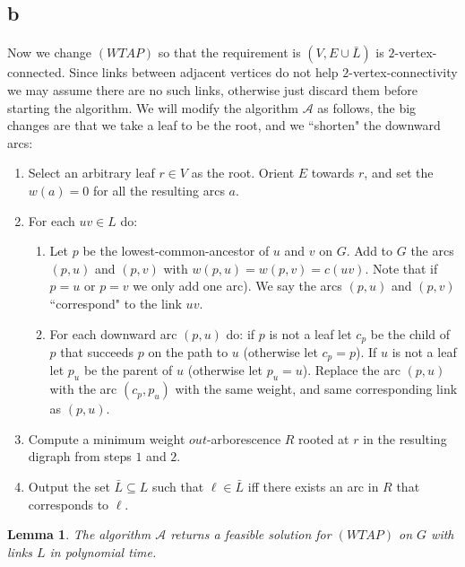\documentclass[letterpaper,12pt,oneside,onecolumn]{article}
\newcommand{\cA}{\mathcal{A}} \newcommand{\cB}{\mathcal{B}}
\newtheorem{lemma}[fact]{Lemma}
\begin{document}
\subsection{b}
\paragraph{}
Now we change $(WTAP)$ so that the requirement is $(V, E\cup \bar{L})$ is $2$-vertex-connected. Since links between adjacent vertices do not help $2$-vertex-connectivity we may assume there are no such links, otherwise just discard them before starting the algorithm. We will modify the algorithm $\cA$ as follows, the big changes are that we take a leaf to be the root, and we ``shorten" the downward arcs:
\begin{enumerate}
\item Select an arbitrary leaf $r \in V$ as the root. Orient $E$ towards $r$, and set the $w(a) = 0$ for all the resulting arcs $a$.
\item For each $uv \in L$ do:
	\begin{enumerate}
	\item Let $p$ be the lowest-common-ancestor of $u$ and $v$ on $G$. Add to $G$ the arcs $(p,u)$ and $(p,v)$ with $w(p,u) = w(p,v) = c(uv)$. Note that if $p=u$ or $p=v$ we only add one arc). We say the arcs $(p,u)$ and $(p,v)$ ``correspond" to the link $uv$.
	\item For each downward arc $(p,u)$ do: if $p$ is not a leaf let $c_p$ be the child of $p$  that succeeds $p$ on the path to $u$ (otherwise let $c_p = p$). If $u$ is not a leaf let $p_u$ be the parent of $u$ (otherwise let $p_u = u$). Replace the arc $(p,u)$ with the arc $(c_p, p_u)$ with the same weight, and same corresponding link as $(p,u)$.
	\end{enumerate}
\item Compute a minimum weight $out$-arborescence $R$ rooted at $r$ in the resulting digraph from steps $1$ and $2$.
\item Output the set $\bar{L} \subseteq L$ such that $\ell \in \bar{L}$ iff there exists an arc in $R$ that corresponds to $\ell$.
\end{enumerate}
\begin{lemma}\label{lemma:3b-poly}
The algorithm $\cA$ returns a feasible solution for $(WTAP)$ on $G$ with links $L$ in polynomial time.
\end{lemma}
\end{document}

